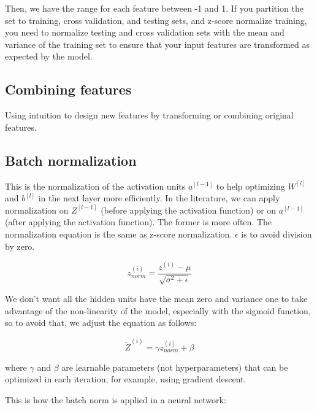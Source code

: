 \documentclass[12pt]{report}
\begin{document}
Then, we have the range for each feature between -1 and 1.
If you partition the set to training, cross validation, and testing sets, and z-score normalize training, you need to normalize testing and cross validation sets with the mean and variance of the training set to ensure that your input features are transformed as expected by the model.


\subsection{Combining features}
Using intuition to design new features by transforming or combining original features.


\subsection{Batch normalization}

This is the normalization of the activation units $a^{[l-1]}$ to help optimizing $W^{[l]}$ and $b^{[l]}$ in the next layer more efficiently. In the literature, we can apply normalization on $Z^{[l-1]}$ (before applying the activation function) or on $a^{[l-1]}$ (after applying the activation function). The former is more often. The normalization equation is the same as z-score normalization. $\epsilon$ is to avoid division by zero.

\begin{equation}
  z_{norm}^{(i)} = \frac{z^{(i)}-\mu}{ \sqrt{\sigma^2 + \epsilon}}
\end{equation}

We don't want all the hidden units have the mean zero and variance one to take advantage of the non-linearity of the model, especially with the sigmoid function, so to avoid that, we adjust the equation as follows:

\begin{equation}
  \tilde{Z}^{(i)} = \gamma  z_{norm}^{(i)}  + \beta
\end{equation}

where $\gamma$ and $\beta$ are learnable parameters (not hyperparameters) that can be optimized in each iteration, for example, using gradient descent.

This is how the batch norm is applied in a neural network:
\end{document}
